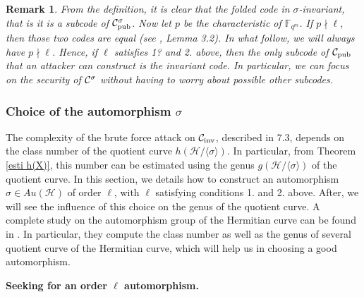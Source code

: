 \documentclass[10pt]{article}
\newtheorem{rq1}{Remark}[]
\newcommand{\s}{\vspace{0.3cm}}
\newcommand{\C}{\mathcal{C}}
\newcommand{\fqm}{\mathbb{F}_{q^m}}
\newcommand{\h}{\mathcal{H}}
\begin{document}
\s

\begin{rq1} \label{un seul subcode} \rm
From the definition, it is clear that the folded code in $\sigma$-invariant, that is it is a subcode of $\C_{\rm pub \it}^{\sigma}$. Now let $p$ be the characteristic of $\fqm$. If $p \nmid \ell$, then those two codes are equal (see \cite{Bar1} , Lemma 3.2). In what follow, we will always have $p \nmid \ell$. Hence, if $\ell$ satisfies 1? and 2. above, then the only subcode of $\mathcal{C}_{\rm pub}$ that an attacker can construct is the invariant code. In particular, we can focus on the security of $\C_{\rm}^{\sigma}$ without having to worry about possible other subcodes.  
\end{rq1}

\s

\subsubsection{Choice of the automorphism $\sigma$}

\s

The complexity of the brute force attack on $\C_{\rm inv}$, described in 7.3, depends on the class number of the quotient curve $h(\mathcal{H}/\langle \sigma \rangle)$. In particular, from Theorem \ref{esti h(X)}, this number can be estimated using the genus $g(\mathcal{H}/\langle \sigma \rangle)$ of the quotient curve. In this section, we details how to construct an automorphism $\sigma \in Au(\h)$ of order $\ell$, with $\ell$ satisfying conditions 1. and 2. above. After, we will see the influence of this choice on the genus of the quotient curve. A complete study on the automorphism group of the Hermitian curve can be found in \cite{Gar}. In particular, they compute the class number as well as the genus of several quotient curve of the Hermitian curve, which will help us in choosing a good automorphism.

\s

\bf {Seeking for an order $\ell$ automorphism.} \rm

\s 
\end{document}
